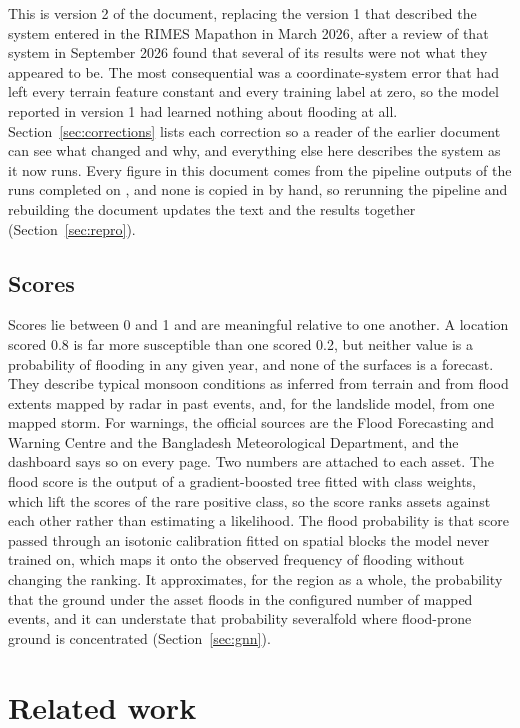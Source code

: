 \documentclass[10pt,a4paper,twocolumn]{article}
\begin{document}
This is version 2 of the document, replacing the version 1 that described the system entered in the RIMES Mapathon in March 2026, after a review of that system in September 2026 found that several of its results were not what they appeared to be. The most consequential was a coordinate-system error that had left every terrain feature constant and every training label at zero, so the model reported in version 1 had learned nothing about flooding at all. Section~\ref{sec:corrections} lists each correction so a reader of the earlier document can see what changed and why, and everything else here describes the system as it now runs. Every figure in this document comes from the pipeline outputs of the runs completed on \RRProcessed{}, and none is copied in by hand, so rerunning the pipeline and rebuilding the document updates the text and the results together (Section~\ref{sec:repro}).

\subsection{Scores}

Scores lie between 0 and 1 and are meaningful relative to one another. A location scored 0.8 is far more susceptible than one scored 0.2, but neither value is a probability of flooding in any given year, and none of the surfaces is a forecast. They describe typical monsoon conditions as inferred from terrain and from flood extents mapped by radar in past events, and, for the landslide model, from one mapped storm. For warnings, the official sources are the Flood Forecasting and Warning Centre and the Bangladesh Meteorological Department, and the dashboard says so on every page. Two numbers are attached to each asset. The flood score is the output of a gradient-boosted tree fitted with class weights, which lift the scores of the rare positive class, so the score ranks assets against each other rather than estimating a likelihood. The flood probability is that score passed through an isotonic calibration fitted on spatial blocks the model never trained on, which maps it onto the observed frequency of flooding without changing the ranking. It approximates, for the region as a whole, the probability that the ground under the asset floods in the configured number of mapped events, and it can understate that probability severalfold where flood-prone ground is concentrated (Section~\ref{sec:gnn}).

\section{Related work}
\label{sec:related}
\end{document}
